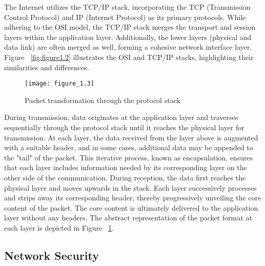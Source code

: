 The Internet utilizes the TCP/IP stack, incorporating the TCP (Transmission Control Protocol) and IP (Internet Protocol) as its primary protocols. While adhering to the OSI model, the TCP/IP stack merges the transport and session layers within the application layer. Additionally, the lower layers (physical and data link) are often merged as well, forming a cohesive network interface layer. Figure ~\ref{fig:figure1.2} illustrates the OSI and TCP/IP stacks, highlighting their similarities and differences.

\begin{figure}[h!]
\centering
\texttt{[image: figure\_1.3]}\\
\caption{Packet transformation through the protocol stack}
\label{fig:figure1.3}
\end{figure}


During transmission, data originates at the application layer and traverses sequentially through the protocol stack until it reaches the physical layer for transmission. At each layer, the data received from the layer above is augmented with a suitable header, and in some cases, additional data may be appended to the "tail" of the packet. This iterative process, known as encapsulation, ensures that each layer includes information needed by its corresponding layer on the other side of the communication. During reception, the data first reaches the physical layer and moves upwards in the stack. Each layer successively processes and strips away its corresponding header, thereby progressively unveiling the core content of the packet. The core content is ultimately delivered to the application layer without any headers. The abstract representation of the packet format at each layer is depicted in Figure ~\ref{fig:figure1.3}.

\subsection{Network Security}


